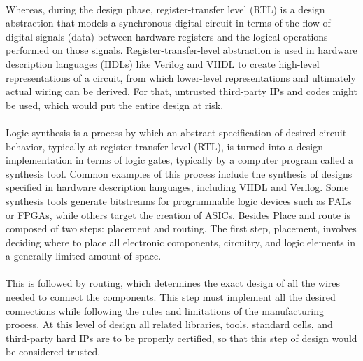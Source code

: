 \paragraph*{}
Whereas, during the design phase, register-transfer level (RTL) is a design abstraction that models a synchronous digital circuit in terms of the flow of digital signals (data) between hardware registers and the logical operations performed on those signals. Register-transfer-level abstraction is used in hardware description languages (HDLs) like Verilog and VHDL to create high-level representations of a circuit, from which lower-level representations and ultimately actual wiring can be derived. For that, untrusted third-party IPs and codes might be used, which would put the entire design at risk.
\paragraph*{}
Logic synthesis is a process by which an abstract specification of desired circuit behavior, typically at register transfer level (RTL), is turned into a design implementation in terms of logic gates, typically by a computer program called a synthesis tool. Common examples of this process include the synthesis of designs specified in hardware description languages, including VHDL and Verilog. Some synthesis tools generate bitstreams for programmable logic devices such as PALs or FPGAs, while others target the creation of ASICs. Besides Place and route is composed of two steps: placement and routing. The first step, placement, involves deciding where to place all electronic components, circuitry, and logic elements in a generally limited amount of space.
\paragraph*{}
This is followed by routing, which determines the exact design of all the wires needed to connect the components. This step must implement all the desired connections while following the rules and limitations of the manufacturing process. At this level of design all related libraries, tools, standard cells, and third-party hard IPs are to be properly certified, so that this step of design would be considered trusted. 
